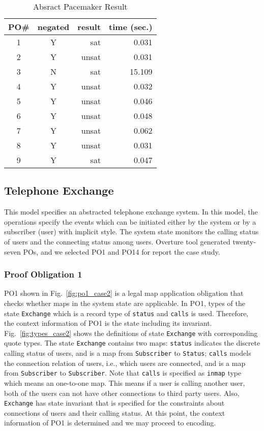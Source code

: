 \begin{table}[htb]
\begin{center}
\begin{tabular}{|c|c|r|r|}
\hline
PO\#	&	negated	&	result	&	time (sec.) \\ \hline
1		&	Y		&	sat		&	0.031 \\ \hline
2		&	Y		&	unsat	&	0.031 \\ \hline
3		&	N		&	sat		&	15.109 \\ \hline
4		&	Y		&	unsat	&	0.032 \\ \hline
5		&	Y		&	unsat	&	0.046 \\ \hline
6		&	Y		&	unsat	&	0.048 \\ \hline
7		&	Y		&	unsat	&	0.062 \\ \hline
8		&	Y		&	unsat	&	0.031 \\ \hline
9		&	Y		&	sat		&	0.047 \\ \hline
\end{tabular}
\end{center}
\caption{Absract Pacemaker Result}
\label{tbl:result1}
\end{table}


\subsection{Telephone Exchange}
\label{section:case2}

This model specifies an abstracted telephone exchange system. In this model, the operations specify the events which can be initiated either by the system or by a subscriber (user) with implicit style. The system state monitors the calling status of users and the connecting status among users. Overture tool generated twenty-seven POs, and we selected PO1 and PO14 for report the case study.

\subsubsection{Proof Obligation 1}

PO1 shown in Fig.~\ref{fig:po1_case2} is a legal map application obligation that checks whether maps in the system state are applicable. In PO1, types of the state {\tt Exchange} which is a record type of {\tt status} and {\tt calls} is used. Therefore, the context information of PO1 is the state including its invariant. Fig.~\ref{fig:types_case2} shows the definitions of state {\tt Exchange} with corresponding quote types. The state {\tt Exchange} contains two maps: {\tt status} indicates the discrete calling status of users, and is a map from {\tt Subscriber} to {\tt Status}; {\tt calls} models the connection relation of users, i.e., which users are connected, and is a map from {\tt Subscriber} to {\tt Subscriber}. Note that {\tt calls} is specified as {\tt inmap} type which means an one-to-one map. This means if a user is calling another user, both of the users can not have other connections to third party users. Also, {\tt Exchange} has state invariant that is specified for the constraints about connections of users and their calling status. At this point, the context information of PO1 is determined and we may proceed to encoding.


